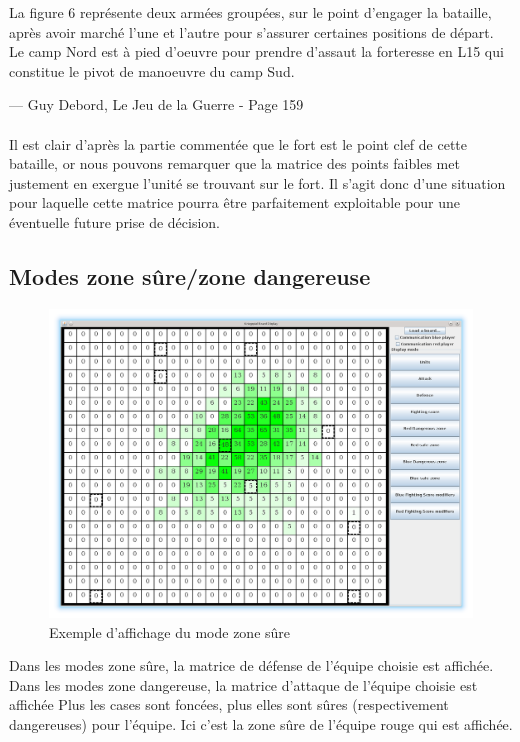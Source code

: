 			\epigraph{La figure 6 représente deux armées groupées, sur le point d'engager la bataille, après avoir marché l'une et l'autre pour s'assurer certaines positions
			de départ. Le camp Nord est à pied d'oeuvre pour prendre d'assaut la forteresse en L15 qui constitue le pivot de manoeuvre du camp Sud.}{--- \textup{Guy Debord}, Le Jeu de la Guerre - Page 159}
						
			\paragraph{}
			Il est clair d'après la partie commentée que le fort est le point clef de cette bataille, or nous pouvons remarquer que la matrice des points faibles
			met justement en exergue l'unité se trouvant sur le fort. Il s'agit donc d'une situation pour laquelle cette matrice pourra être parfaitement exploitable
			pour une éventuelle future prise de décision.	
			
			\clearpage	

		\subsection{Modes zone sûre/zone dangereuse}
			\begin{figure}[!h]
				\centerline{\includegraphics[scale=0.4]{images/screen_safe.png}}
				\caption{Exemple d'affichage du mode zone sûre}
			\end{figure}

			Dans les modes zone sûre, la matrice de défense de l'équipe choisie est affichée.
			Dans les modes zone dangereuse, la matrice d'attaque de l'équipe choisie est affichée
			Plus les cases sont foncées, plus elles sont sûres (respectivement dangereuses) pour l'équipe.
			Ici c'est la zone sûre de l'équipe rouge qui est affichée.


